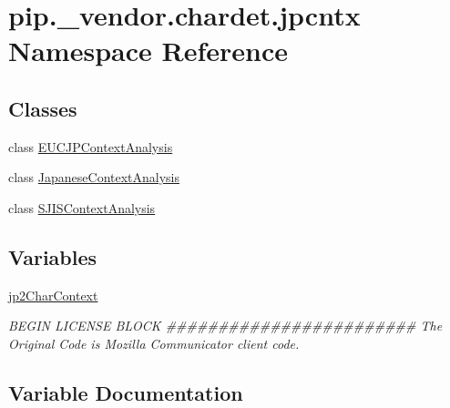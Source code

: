 \hypertarget{namespacepip_1_1__vendor_1_1chardet_1_1jpcntx}{}\section{pip.\+\_\+vendor.\+chardet.\+jpcntx Namespace Reference}
\label{namespacepip_1_1__vendor_1_1chardet_1_1jpcntx}
\subsection*{Classes}
\begin{DoxyCompactItemize}
\item 
class \hyperlink{classpip_1_1__vendor_1_1chardet_1_1jpcntx_1_1EUCJPContextAnalysis}{E\+U\+C\+J\+P\+Context\+Analysis}
\item 
class \hyperlink{classpip_1_1__vendor_1_1chardet_1_1jpcntx_1_1JapaneseContextAnalysis}{Japanese\+Context\+Analysis}
\item 
class \hyperlink{classpip_1_1__vendor_1_1chardet_1_1jpcntx_1_1SJISContextAnalysis}{S\+J\+I\+S\+Context\+Analysis}
\end{DoxyCompactItemize}
\subsection*{Variables}
\begin{DoxyCompactItemize}
\item 
\hyperlink{namespacepip_1_1__vendor_1_1chardet_1_1jpcntx_ad1a64717c849306150c4658d90ae8dcc}{jp2\+Char\+Context}
\begin{DoxyCompactList}\small\item\em B\+E\+G\+IN L\+I\+C\+E\+N\+SE B\+L\+O\+CK \#\#\#\#\#\#\#\#\#\#\#\#\#\#\#\#\#\#\#\#\#\#\#\# The Original Code is Mozilla Communicator client code. \end{DoxyCompactList}\end{DoxyCompactItemize}


\subsection{Variable Documentation}
\mbox{\label{namespacepip_1_1__vendor_1_1chardet_1_1jpcntx_ad1a64717c849306150c4658d90ae8dcc}} 
